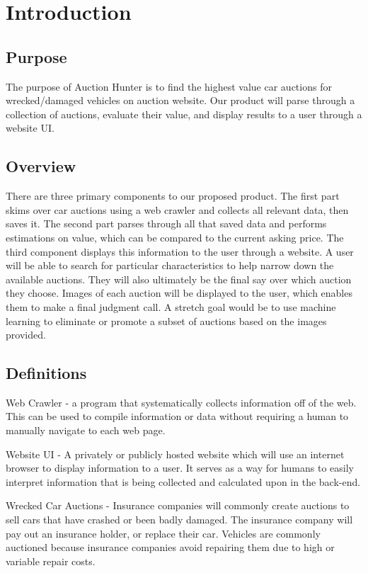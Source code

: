 \documentclass[onecolumn, draftclsnofoot,10pt, compsoc]{IEEEtran}
\begin{document}
\section{Introduction}
\subsection{Purpose}
The purpose of Auction Hunter is to find the highest value car auctions for wrecked/damaged vehicles on auction website.
Our product will parse through a collection of auctions, evaluate their value, and display results to a user through a website UI. 
\subsection{Overview}
There are three primary components to our proposed product. The first part skims over car auctions using a web crawler and collects all relevant data, then saves it. The second part parses through all that saved data and performs estimations on value, which can be compared to the current asking price. The third component displays this information to the user through a website. A user will be able to search for particular characteristics to help narrow down the available auctions. They will also ultimately be the final say over which auction they choose. Images of each auction will be displayed to the user, which enables them to make a final judgment call. A stretch goal would be to use machine learning to eliminate or promote a subset of auctions based on the images provided.

\subsection{Definitions}
Web Crawler - a program that systematically collects information off of the web. This can be used to compile information or data without requiring a human to manually navigate to each web page. 

Website UI - A privately or publicly hosted website which will use an internet browser to display information to a user. It serves as a way for humans to easily interpret information that is being collected and calculated upon in the back-end. 

Wrecked Car Auctions - Insurance companies will commonly create auctions to sell cars that have crashed or been badly damaged. The insurance company will pay out an insurance holder, or replace their car. Vehicles are commonly auctioned because insurance companies avoid repairing them due to high or variable repair costs. 
\end{document}

